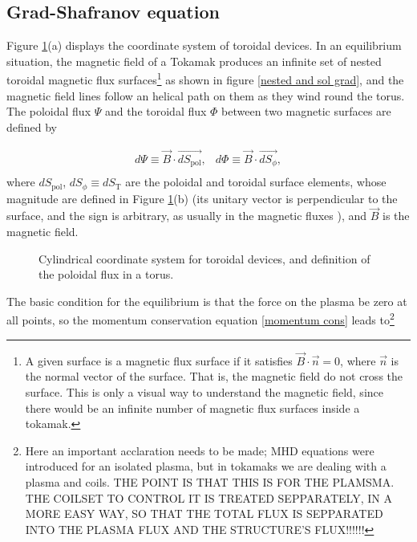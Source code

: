 \documentclass[a4paper,12pt,oneside]{book}
\begin{document}
\subsection[Grad-Shafranov eq.]{Grad-Shafranov equation}
\label{sec grad}

Figure \ref{coord y flux}(a) displays the coordinate system of toroidal devices. In an equilibrium situation, the magnetic field of a Tokamak produces an infinite set of nested toroidal magnetic flux surfaces\footnote{A given surface is a magnetic flux surface if it satisfies $\vec{B} \cdot \vec{n}=0$, where $\vec{n}$ is the normal vector of the surface. That is, the magnetic field do not cross the surface. This is only a visual way to understand the magnetic field, since there would be an infinite number of magnetic flux surfaces inside a tokamak.} as shown in figure \ref{nested and sol grad}, and the magnetic field lines follow an helical path on them as they wind round the torus. The poloidal flux $\Psi$ and the toroidal flux $\Phi$ between two magnetic surfaces are defined by

\begin{equation}
\begin{array}{cc}

d\Psi \equiv \vec{B} \cdot \vec{dS_\text{pol}}, & d\Phi \equiv \vec{B} \cdot \vec{dS_\phi},\\

\end{array}
\end{equation}
%
where $dS_\text{pol}$, $dS_\phi \equiv dS_\text{T}$ are the poloidal and toroidal surface elements, whose magnitude are defined in Figure \ref{coord y flux}(b) (its unitary vector is perpendicular to the surface, and the sign is arbitrary, as usually in the magnetic fluxes ), and $\vec{B}$ is the magnetic field.
%
\begin{figure}[t]
\centering
{}
\hspace{3cm}
\caption{Cylindrical coordinate system for toroidal devices, and definition of the poloidal flux in a torus.}
\label{coord y flux}
\end{figure}
%
The basic condition for the equilibrium is that the force on the plasma be zero at all points, so the momentum conservation equation \eqref{momentum cons} leads to\footnote{Here an important acclaration needs to be made; MHD equations were introduced for an isolated plasma, but in tokamaks we are dealing with a plasma and coils. THE POINT IS THAT THIS IS FOR THE PLAMSMA. THE COILSET TO CONTROL IT IS TREATED SEPPARATELY, IN A MORE EASY WAY, SO THAT THE TOTAL FLUX IS SEPPARATED INTO THE PLASMA FLUX AND THE STRUCTURE'S FLUX!!!!!!}
\end{document}
